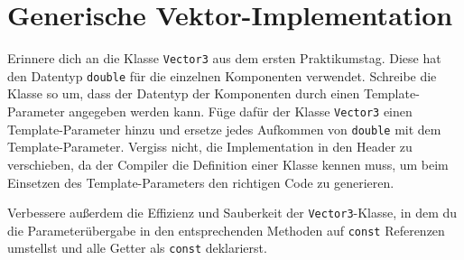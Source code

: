 \section{Generische Vektor-Implementation}
Erinnere dich an die Klasse \texttt{Vector3} aus dem ersten Praktikumstag. Diese hat den Datentyp \texttt{double} für die einzelnen Komponenten verwendet. Schreibe die Klasse so um, dass der Datentyp der Komponenten durch einen Template-Parameter angegeben werden kann.
Füge dafür der Klasse \texttt{Vector3} einen Template-Parameter hinzu und ersetze jedes Aufkommen von \texttt{double} mit dem Template-Parameter.
Vergiss nicht, die Implementation in den Header zu verschieben, da der Compiler die Definition einer Klasse kennen muss, um beim Einsetzen des Template-Parameters den richtigen Code zu generieren.

Verbessere außerdem die Effizienz und Sauberkeit der \texttt{Vector3}-Klasse, in dem du die Parameterübergabe in den entsprechenden Methoden auf \texttt{const} Referenzen umstellst und alle Getter als \texttt{const} deklarierst.
